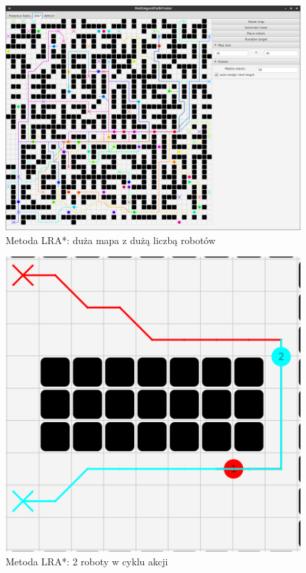 \begin{figure}
	\centering
	\includegraphics[width=0.8\columnwidth]{img/robopath/lra-bigmap}
	\caption{Metoda LRA*: duża mapa z dużą liczbą robotów}
	\label{fig:test-lra-bigmap}
\end{figure}

\begin{figure}
	\centering
	\includegraphics[width=0.8\columnwidth]{img/robopath/lra-cycle}
	\caption{Metoda LRA*: 2 roboty w cyklu akcji}
	\label{fig:test-lra-cycle}
\end{figure}

